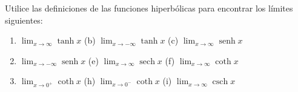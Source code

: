 \item Utilice las definiciones de las funciones hiperbólicas para encontrar los límites siguientes:
    \begin{enumerate}
        \item[(a)] $\lim_{x \to \infty} \tanh x$ \quad (b) $\lim_{x \to -\infty} \tanh x$ \quad (c) $\lim_{x \to \infty} \operatorname{senh} x$
        \item[(d)] $\lim_{x \to -\infty} \operatorname{senh} x$ \quad (e) $\lim_{x \to \infty} \operatorname{sech} x$ \quad (f) $\lim_{x \to \infty} \coth x$
        \item[(g)] $\lim_{x \to 0^+} \coth x$ \quad (h) $\lim_{x \to 0^-} \coth x$ \quad (i) $\lim_{x \to \infty} \operatorname{csch} x$
    \end{enumerate}
